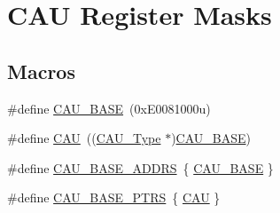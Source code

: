 \hypertarget{group___c_a_u___register___masks}{}\section{C\+AU Register Masks}
\label{group___c_a_u___register___masks}
\subsection*{Macros}
\begin{DoxyCompactItemize}
\item 
\#define \mbox{\hyperlink{group___c_a_u___register___masks_ga4bae7acee3c09ef910c11c3536bbbbc1}{C\+A\+U\+\_\+\+B\+A\+SE}}~(0x\+E0081000u)
\item 
\#define \mbox{\hyperlink{group___c_a_u___register___masks_ga0e3e4bb9b7bb5ef30b07e8925c56b950}{C\+AU}}~((\mbox{\hyperlink{struct_c_a_u___type}{C\+A\+U\+\_\+\+Type}} $\ast$)\mbox{\hyperlink{group___c_a_u___register___masks_ga4bae7acee3c09ef910c11c3536bbbbc1}{C\+A\+U\+\_\+\+B\+A\+SE}})
\item 
\#define \mbox{\hyperlink{group___c_a_u___register___masks_ga93a57ce0e99e2ff0985950f9452b5777}{C\+A\+U\+\_\+\+B\+A\+S\+E\+\_\+\+A\+D\+D\+RS}}~\{ \mbox{\hyperlink{group___c_a_u___register___masks_ga4bae7acee3c09ef910c11c3536bbbbc1}{C\+A\+U\+\_\+\+B\+A\+SE}} \}
\item 
\#define \mbox{\hyperlink{group___c_a_u___register___masks_gaadc82a2eed7dcf40fa9a17abe0f2ff6e}{C\+A\+U\+\_\+\+B\+A\+S\+E\+\_\+\+P\+T\+RS}}~\{ \mbox{\hyperlink{group___c_a_u___register___masks_ga0e3e4bb9b7bb5ef30b07e8925c56b950}{C\+AU}} \}
\end{DoxyCompactItemize}
